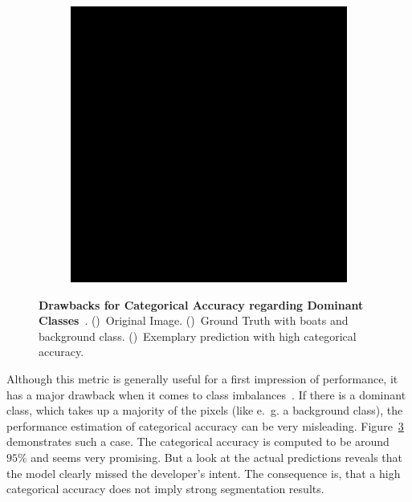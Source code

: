 \begin{figure}[h]
\begin{subfigure}{\CategoricalAccuracyImageWidth}
        \caption{}
        \label{fig:ca_truth}
    \end{subfigure}
    \hfill
    \begin{subfigure}{\CategoricalAccuracyImageWidth}
        \includegraphics[width=\textwidth]{images/categorical_accuracy_prediction}
        \caption{}
        \label{fig:ca_prediction}
    \end{subfigure}
    \hfill
    \caption[Drawbacks for Categorical Accuracy regarding Dominant Classes]
    {\textbf{Drawbacks for Categorical Accuracy regarding Dominant Classes}~\cite{tds_segmentation18}. ()~Original Image.  ()~Ground Truth with boats and background class. ()~Exemplary prediction with high categorical accuracy.}
    \label{fig:categorical_accuracy_drawbacks}
\end{figure}

Although this metric is generally useful for a first impression of performance, it has a major drawback when it comes to class imbalances~\cite{tds_segmentation18}. If there is a dominant class, which takes up a majority of the pixels (like e.~g. a background class), the performance estimation of categorical accuracy can be very misleading. Figure~\ref{fig:categorical_accuracy_drawbacks} demonstrates such a case. The categorical accuracy is computed to be around $95\%$ and seems very promising. But a look at the actual predictions reveals that the model clearly missed the developer's intent. The consequence is, that a high categorical accuracy does not imply strong segmentation results.

